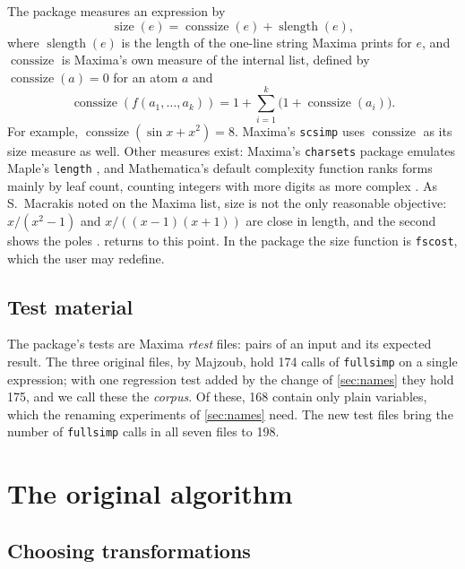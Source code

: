 \documentclass[11pt]{amsart}
\newcommand{\mx}{\lstinline[style=mx]}
\theoremstyle{definition}
\theoremstyle{remark}
\DeclareMathOperator{\size}{size}
\DeclareMathOperator{\conssize}{conssize}
\DeclareMathOperator{\slength}{slength}
\begin{document}
The package measures an expression by
\begin{equation}\label{eq:size}
  \size(e) = \conssize(e) + \slength(e),
\end{equation}
where $\slength(e)$ is the length of the one-line string Maxima prints for
$e$, and $\conssize$ is Maxima's own measure of the internal list, defined
by $\conssize(a) = 0$ for an atom $a$ and
\[
  \conssize(f(a_1,\dots,a_k)) = 1 + \sum_{i=1}^{k} \bigl(1 + \conssize(a_i)\bigr).
\]
For example, $\conssize(\sin x + x^2) = 8$. Maxima's \mx|scsimp| uses
$\conssize$ as its size measure as well. Other measures exist: Maxima's
\texttt{charsets} package emulates Maple's \texttt{length}
\cite{Talon25}, and Mathematica's default complexity function ranks forms
mainly by leaf count, counting integers with more digits as more complex
\cite{WolframFullSimplify}. As S.~Macrakis noted on the Maxima
list, size is not the only reasonable objective: $x/(x^2-1)$ and
$x/((x-1)(x+1))$ are close in length, and the second shows the poles
\cite{Macrakis18}.  returns to this point. In the package
the size function is \mx|fscost|, which the user may redefine.

\subsection{Test material}\label{sec:corpus}

The package's tests are Maxima \emph{rtest} files: pairs of an input and its
expected result. The three original files, by Majzoub, hold 174 calls of
\mx|fullsimp| on a single expression; with one regression test added by the
change of \cref{sec:names} they hold 175, and we call these the
\emph{corpus}. Of these, 168 contain only plain variables, which the renaming
experiments of \cref{sec:names} need. The new test files bring the number of
\mx|fullsimp| calls in all seven files to 198.

\section{The original algorithm}\label{sec:original}

\subsection{Choosing transformations}
\end{document}
